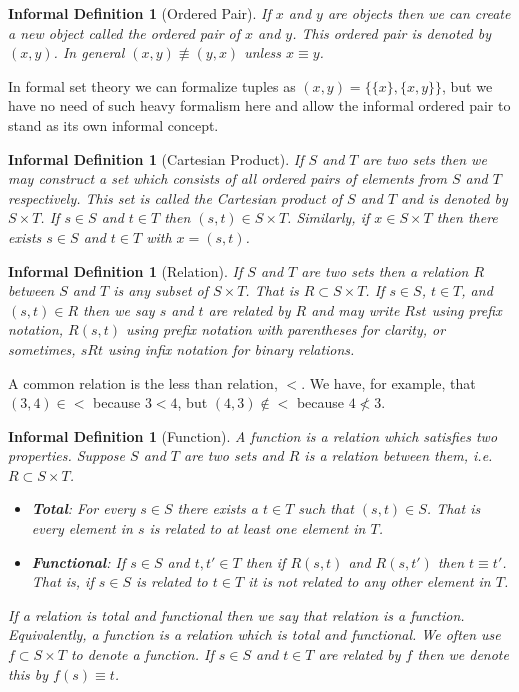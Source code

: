 \documentclass[12pt]{article}
\theoremstyle{break}
\theoremstyle{break}
\theoremstyle{break}
\theoremstyle{break}
\theoremstyle{break}
\newtheorem{informal definition}[definition]{Informal Definition}
\begin{document}
\begin{informal definition}[Ordered Pair]
If $x$ and $y$ are objects then we can create a new object called the ordered pair of $x$ and $y$.
This ordered pair is denoted by $(x, y)$.
In general $(x, y) \not \equiv (y, x)$ unless $x\equiv y$.
\end{informal definition}
In formal set theory we can formalize tuples as $(x, y) = \{\{x\}, \{x, y\}\}$, but we have no need of such heavy formalism here and allow the informal ordered pair to stand as its own informal concept.

\begin{informal definition}[Cartesian Product]
If $S$ and $T$ are two sets then we may construct a set which consists of all ordered pairs of elements from $S$ and $T$ respectively.
This set is called the Cartesian product of $S$ and $T$ and is denoted by $S\times T$.
If $s\in S$ and $t\in T$ then $(s, t) \in S\times T$.
Similarly, if $x\in S\times T$ then there exists $s\in S$ and $t\in T$ with $x = (s, t)$.
\end{informal definition}

\begin{informal definition}[Relation]
If $S$ and $T$ are two sets then a relation $R$ between $S$ and $T$ is any subset of $S\times T$. That is $R\subset S\times T$.
If $s\in S$, $t\in T$, and $(s, t)\in R$ then we say $s$ and $t$ are related by $R$ and may write $Rst$ using prefix notation, $R(s, t)$ using prefix notation with parentheses for clarity, or sometimes, $sRt$ using infix notation for binary relations.
\end{informal definition}
A common relation is the less than relation, $<$.
We have, for example, that $(3, 4) \in <$ because $3<4$, but $(4,3)\not \in <$ because $4\not < 3$.

\begin{informal definition}[Function]
A function is a relation which satisfies two properties.
Suppose $S$ and $T$ are two sets and $R$ is a relation between them, i.e. $R\subset S\times T$.
\begin{itemize}
\item{\textbf{Total}: For every $s\in S$ there exists a $t\in T$ such that $(s, t) \in S$. That is every element in $s$ is related to at least one element in $T$.}
\item{\textbf{Functional}: If $s\in S$ and $t, t'\in T$ then if $R(s, t)$ and $R(s, t')$ then $t\equiv t'$. That is, if $s\in S$ is related to $t\in T$ it is not related to any other element in $T$.}
\end{itemize}
If a relation is total and functional then we say that relation is a function.
Equivalently, a function is a relation which is total and functional.
We often use $f\subset S\times T$ to denote a function.
If $s\in S$ and $t\in T$ are related by $f$ then we denote this by $f(s) \equiv t$.
\end{informal definition}
\end{document}
